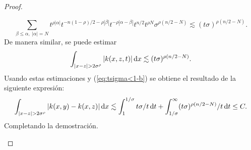 \begin{proof}
\begin{itemize}
\begin{equation*}
			\sum_{\beta\leq\alpha,\; |\alpha|=N} t^{\rho|\alpha|}t^{-n(1-\rho)/2 - \rho|\beta|}t^{-\rho|\alpha-\beta|}t^{n/2}t^{\rho N} \sigma^{\rho(n/2 - N)} \lesssim (t\sigma)^{\rho (n/2 - N)}.
		\end{equation*}
		De manera similar, se puede estimar 
		\begin{equation*}
			\int_{|x-z|>2\sigma^\rho} |k(x, z, t)| \diff x \lesssim (t\sigma)^{\rho(n/2 - N)}.
		\end{equation*}
		Usando estas estimaciones y (\ref{eq:tsigma<1-b}) se obtiene el resultado de la siguiente expresión:
		\begin{equation}
			\int_{|x-z| > 2\sigma^\rho}|k(x, y) - k(x, z)|\mathop{}\!\mathrm{d} x \lesssim \int_1^{1/\sigma} t\sigma/t \mathop{}\!\mathrm{d} t + \int_{1/\sigma}^\infty(t\sigma)^{\rho(n/2-N)}/t\mathop{}\!\mathrm{d} t \leq C
			\label{eq:ultima-cota-b}.
		\end{equation} 
		Completando la demostración.\\
		

\end{itemize}
\end{proof}
